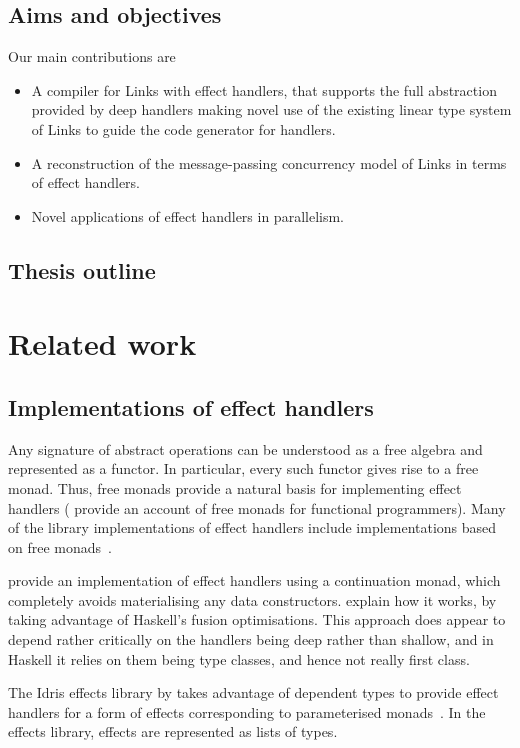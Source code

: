 \documentclass[mscres,cdtppar,twoside,openright,logo,rightchapter,normalheadings]{infthesis}
\theoremstyle{definition}
\begin{document}
\section{Aims and objectives}
Our main contributions are
\begin{itemize}
  \item A compiler for Links with effect handlers, that supports the
    full abstraction provided by deep handlers making novel use of the
    existing linear type system of Links to guide the code generator for
    handlers.
  \item A reconstruction of the message-passing concurrency model of
    Links in terms of effect handlers. 
  \item Novel applications of effect handlers in parallelism.
\end{itemize}
\section{Thesis outline}

\chapter{Related work}
\label{ch:related-work}

\section{Implementations of effect handlers}
Any signature of abstract operations can be understood as a free
algebra and represented as a functor. In particular, every such
functor gives rise to a free monad. Thus, free monads provide a
natural basis for implementing effect handlers (\citet{Swierstra2008b}
provide an account of free monads for functional programmers).  Many
of the library implementations of effect handlers include
implementations based on free monads~\citep{Kammar2013, Kiselyov2013,
  Kiselyov2015, Brady2013, Wu2014}.

\citet{Kammar2013} provide an implementation of effect handlers using
a continuation monad, which completely avoids materialising any data
constructors. \citet{Wu2015} explain how it works, by taking advantage
of Haskell's fusion optimisations. This approach does appear to depend
rather critically on the handlers being deep rather than shallow, and
in Haskell it relies on them being type classes, and hence not really
first class.

The Idris effects library by \cite{Brady2013} takes advantage of
dependent types to provide effect handlers for a form of effects
corresponding to parameterised monads~\citep{Atkey09}.
%
In the effects library, effects are represented as lists of types.
\end{document}
